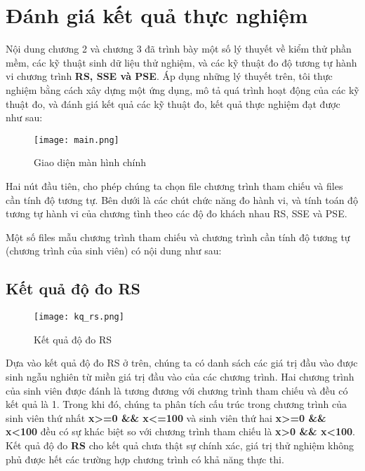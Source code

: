 \section{Đánh giá kết quả thực nghiệm}
Nội dung chương 2 và chương 3 đã trình bày một số lý thuyết về kiểm thử phần mềm, các kỹ thuật sinh dữ liệu thử nghiệm, và các kỹ thuật đo độ tương tự hành vi chương trình \textbf{RS, SSE và PSE}. Áp dụng những lý thuyết trên, tôi thực nghiệm bằng cách xây dựng một ứng dụng, mô tả quá trình hoạt động của các kỹ thuật đo, và đánh giá kết quả các kỹ thuật đo, kết quả thực nghiệm đạt được như sau:

\begin{center}
	\begin{figure}[h]
		\begin{center}
			\texttt{[image: main.png]}
		\end{center}
		\caption{Giao diện màn hình chính}		
	\end{figure}
\end{center}

Hai nút đầu tiên, cho phép chúng ta chọn file chương trình tham chiếu và files cần tính độ tương tự. Bên dưới là các chút chức năng đo hành vi, và tính toán độ tương tự hành vi của chương tình theo các độ đo khách nhau RS, SSE và PSE.

Một số files mẫu chương trình tham chiếu và chương trình cần tính độ tương tự (chương trình của sinh viên) có nội dung như sau:





\subsection{Kết quả độ đo RS}
\begin{center}
	\begin{figure}[h]
		\begin{center}
			\texttt{[image: kq\_rs.png]}
		\end{center}
		\caption{Kết quả độ đo RS}		
	\end{figure}
\end{center}

Dựa vào kết quả độ đo RS ở trên, chúng ta có danh sách các giá trị đầu vào được sinh ngẫu nghiên từ miền giá trị đầu vào của các chương trình. Hai chương trình của sinh viên được đánh là tương đương với chương trình tham chiếu và đều có kết quả là 1. Trong khi đó, chúng ta phân tích cấu trúc trong chương trình của sinh viên thứ nhất \textbf{x>=0 \&\& x<=100} và sinh viên thứ hai \textbf{x>=0 \&\& x<100} đều có sự khác biệt so với chương trình tham chiếu là \textbf{x>0 \&\& x<100}. Kết quả độ đo \textbf{RS} cho kết quả chưa thật sự chính xác, giá trị thử nghiệm không phủ được hết các trường hợp chương trình có khả năng thực thi.

